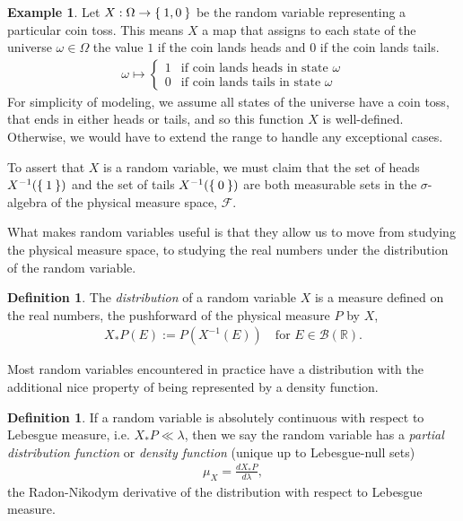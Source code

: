 \documentclass[11pt,reqno]{amsart}
\theoremstyle{definition}
\newtheorem{definition}[theorem]{Definition}
\newtheorem{example}[theorem]{Example}
\theoremstyle{remark}
\begin{document}
\begin{example}
	Let \( X : \Omega \rightarrow \Set{1,0} \) be the random variable representing a particular coin toss. This means \(X\)  a map that assigns to each state of the universe \( \omega \in \Omega \) the value \(1\) if the coin lands heads and \(0\) if the coin lands tails.
	\begin{align*}
		\omega \mapsto \begin{cases}
			               1 & \text{if coin lands heads in state } \omega \\
			               0 & \text{if coin lands tails in state } \omega
		               \end{cases}
	\end{align*}
	For simplicity of modeling, we assume all states of the universe have a coin toss, that ends in either heads or tails, and so this function \(X\) is well-defined.
	Otherwise, we would have to extend the range to handle any exceptional cases.

	To assert that \(X\) is a random variable, we must claim that the set of heads \(X^{-1}(\Set{1})\) and the set of tails \(X^{-1}(\Set{0})\) are both measurable sets in the \(\sigma\)-algebra of the physical measure space, \(\mathcal{F}\).
\end{example}

What makes random variables useful is that they allow us to move from studying the physical measure space, to studying the real numbers under the distribution of the random variable.

\begin{definition}
	The \emph{distribution} of a random variable \(X\) is a measure defined on the real numbers, the pushforward of the physical measure \(P\) by \(X\),
	\begin{align*}
		X_{*}P (E) := P \left( X^{-1}(E) \right) \quad \text{for } E \in \mathcal{B}(\mathbb{R}).
	\end{align*}
\end{definition}

Most random variables encountered in practice have a distribution with the additional nice property of being represented by a density function.

\begin{definition}
	If a random variable is absolutely continuous with respect to Lebesgue measure, i.e. \(X_{*}P \ll \lambda\), then we say the random variable has a \emph{partial distribution function} or \emph{density function} (unique up to Lebesgue-null sets)
	\begin{align*}
		\mu_{X} = \frac{d X_{*}P}{d\lambda},
	\end{align*}
	the Radon-Nikodym derivative of the distribution with respect to Lebesgue measure.
\end{definition}
\end{document}
